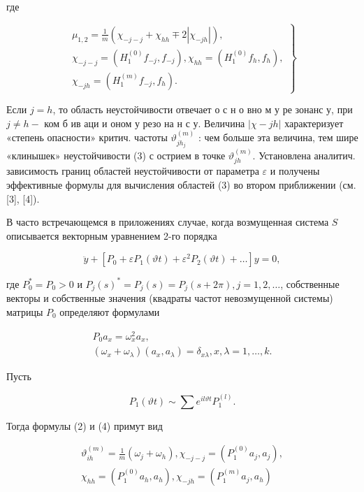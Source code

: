 \documentclass[10pt]{article}
\begin{document}
где

\[
\left.\begin{array}{c}
\mu_{1,2}=\frac{1}{m}\left(\chi_{-j-j}+\chi_{h h} \mp 2\left|\chi_{-j h}\right|\right), \\
\chi_{-j-j}=\left(H_{1}^{(0)} f_{-j}, f_{-j}\right), \chi_{h h}=\left(H_{1}^{(0)} f_{h}, f_{h}\right), \\
\chi_{-j h}=\left(H_{1}^{(m)} f_{-j}, f_{h}\right) .
\end{array}\right\}
\]

Если $j=h$, то область неустойчивости отвечает о с н о вно м у ре зонанс у, при $j \neq h-$ ком б ив аци и оном у резо на н с у. Величина $|\chi-j h|$ характеризует «степень опасности» критич. частоты $\vartheta_{j h_{j}}^{(m)}$ : чем больше эта величина, тем шире «клинышек» неустойчивости (3) с острием в точке $\vartheta_{j h}^{(m)}$. Установлена аналитич. зависимость границ областей неустойчивости от параметра $\varepsilon$ и получены эффективные формулы для вычисления областей (3) во втором приближении (см. [3], [4]).

В часто встречающемся в приложениях случае, когда возмущенная система $S$ описывается векторным уравнением 2-го порядка

\[
\ddot{y}+\left[P_{0}+\varepsilon P_{1}(\vartheta t)+\varepsilon^{2} P_{2}(\vartheta t)+\ldots\right] y=0,
\]

где $P_{0}^{*}=P_{0}>0$ и $P_{j}(s)^{*}=P_{j}(s)=P_{j}(s+2 \pi), j=1,2, \ldots$, собственные векторы и собственные значения (квадраты частот невозмущенной системы) матрицы $P_{0}$ определяют формулами

\[
\begin{gathered}
P_{0} a_{x}=\omega_{x}^{2} a_{x}, \\
\left(\omega_{x}+\omega_{\lambda}\right)\left(a_{x}, a_{\lambda}\right)=\delta_{x \lambda}, x, \lambda=1, \ldots, k .
\end{gathered}
\]

Пусть

\[
P_{1}(\vartheta t) \sim \sum e^{i l \vartheta t} P_{1}^{(l)} .
\]

Тогда формулы (2) и (4) примут вид

\[
\begin{gathered}
\vartheta_{i h}^{(m)}=\frac{1}{m}\left(\omega_{j}+\omega_{h}\right), \chi_{-j-j}=\left(P_{1}^{(0)} a_{j}, a_{j}\right), \\
\chi_{h h}=\left(P_{1}^{(0)} a_{h}, a_{h}\right), \chi_{-j h}=\left(P_{1}^{(m)} a_{j}, a_{h}\right)
\end{gathered}
\]
\end{document}

